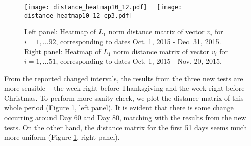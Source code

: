 \documentclass[arxiv, preprint]{imsart}
\numberwithin{equation}{section}
\theoremstyle{plain}
\begin{document}
%

\begin{figure}[h]
    \centering
     \texttt{[image: distance\_heatmap10\_12.pdf]} \ \ 
       \texttt{[image: distance\_heatmap10\_12\_cp3.pdf]} 
    \caption{Left panel: Heatmap of $L_1$ norm distance matrix of vector $v_i$ for $i = 1, \hdots 92$, corresponding to dates Oct. 1, 2015 - Dec. 31, 2015. Right panel: Heatmap of $L_1$ norm distance matrix of vector $v_i$ for $i = 1, \hdots 51$, corresponding to dates Oct. 1, 2015 - Nov. 20, 2015.}
    \label{fig:distance_heatmap}
\end{figure}


From the reported changed intervals, the results from the three new tests are more sensible -- the week right before Thanksgiving and the week right before Christmas.  To perform more sanity check, we plot the distance matrix of this whole period (Figure \ref{fig:distance_heatmap}, left panel).  It is evident that there is some change occurring around Day 60 and Day 80, matching with the results from the new tests.   On the other hand, the distance matrix for the first 51 days seems much more uniform (Figure \ref{fig:distance_heatmap}, right panel). 
\end{document}
